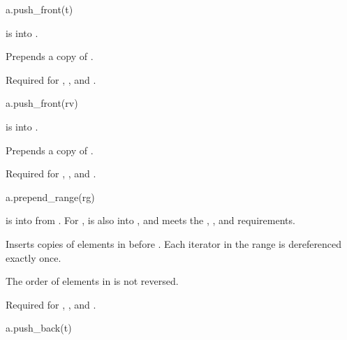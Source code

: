 \begin{itemdecl}
a.push_front(t)
\end{itemdecl}

\begin{itemdescr}
\pnum
\result
{}

\pnum
\expects
{} is  into .

\pnum
\effects
Prepends a copy of .

\pnum
\remarks
Required for
,
, and
.
\end{itemdescr}

\begin{itemdecl}
a.push_front(rv)
\end{itemdecl}

\begin{itemdescr}
\pnum
\result
{}

\pnum
\expects
{} is  into .

\pnum
\effects
Prepends a copy of .

\pnum
\remarks
Required for
,
, and
.
\end{itemdescr}

\begin{itemdecl}
a.prepend_range(rg)
\end{itemdecl}

\begin{itemdescr}
\pnum
\result
{}

\pnum
\expects
{} is  into 
from .
For ,
 is also  into , and
 meets the
,
, and
 requirements.

\pnum
\effects
Inserts copies of elements in  before .
Each iterator in the range  is dereferenced exactly once.
\begin{note}
The order of elements in  is not reversed.
\end{note}

\pnum
\remarks
Required for
,
, and
.
\end{itemdescr}

\begin{itemdecl}
a.push_back(t)
\end{itemdecl}

